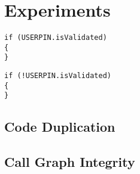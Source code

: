 \chapter{Experiments}

\begin{lstlisting}[caption=Purse code sample from the \jc samples.]
if (USERPIN.isValidated)
{
}
\end{lstlisting}

\begin{lstlisting}[caption=Purse code sample from the \jc samples with a bit flipped to change the comparison.]
if (!USERPIN.isValidated)
{
}
\end{lstlisting}
\section{Code Duplication}

\section{Call Graph Integrity}
